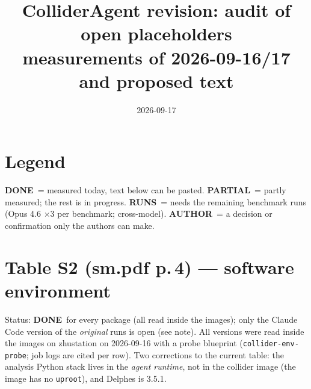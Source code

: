 \documentclass[11pt]{article}
\title{ColliderAgent revision: audit of open placeholders\\ \large measurements of 2026-09-16/17 and proposed text}
\date{2026-09-17}
\newcommand{\statusdone}{\textcolor{green!50!black}{\textbf{DONE}}}
\newcommand{\statuspartial}{\textcolor{orange!80!black}{\textbf{PARTIAL}}}
\newcommand{\statusneedrun}{\textcolor{blue!70!black}{\textbf{RUNS}}}
\newcommand{\statusauthor}{\textcolor{red!70!black}{\textbf{AUTHOR}}}
\begin{document}
\maketitle

\section*{Legend}
\statusdone\ = measured today, text below can be pasted. \statuspartial\ = partly measured; the rest is in progress.
\statusneedrun\ = needs the remaining benchmark runs (Opus 4.6 $\times$3 per benchmark; cross-model). \statusauthor\ = a decision or confirmation only the authors can make.

\section{Table S2 (sm.pdf p.\,4) --- software environment}
Status: \statusdone\ for every package (all read inside the images); only the Claude Code version of the \emph{original} runs is open (see note).
All versions were read inside the images on zhustation on 2026-09-16 with a probe blueprint
(\texttt{collider-env-probe}; job logs are cited per row). Two corrections to the current table: the analysis Python
stack lives in the \emph{agent runtime}, not in the collider image (the image has no \texttt{uproot}), and Delphes is 3.5.1.
\end{document}
